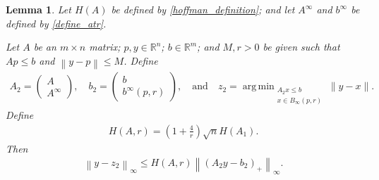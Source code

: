 \documentclass{article}
\newtheorem{lemma}[theorem]{Lemma}
\theoremstyle{case}
\numberwithin{theorem}{subsection}
\DeclareMathOperator*{\argmin}{arg\,min}
\newcommand{\atr}{A^{\infty}}
\newcommand{\btr}{b^{\infty}}
\newcommand{\bpr}{{B_{\infty}\left(p, r\right)}}
\newcommand{\Rm}{\mathbb R^m}
\newcommand{\Rn}{\mathbb R^n}
\begin{document}
\begin{lemma}
\label{version_of_hoffman_with_infinity_ball}
Let $H(A)$ be defined by \cref{hoffman_definition}; and let $\atr$ and $\btr$ be defined by \cref{define_atr}.

Let $A$ be an $m \times n$ matrix;
$p, y \in \Rn$; $b \in \Rm$;
and $M, r > 0$ be given 
such that $Ap \le b$ and $\left\|y - p\right\| \le M$.
Define 
\begin{align*}
A_2 = \begin{pmatrix} A \\ \atr \end{pmatrix},
\quad
b_2 = \begin{pmatrix} b \\ \btr\left(p, r\right) \end{pmatrix},
\quad \textrm{and} \quad
z_2 = \argmin_{\substack{A_2 x \le b \\ x \in \bpr} } \|y - x\|.
\end{align*}
Define 
\begin{align}
H\left(A, r\right) = \left(1 + \frac 4 r\right)\sqrt{n} H\left(A_1\right).
\label{define_har}
\end{align}
Then
\begin{align*}
\left\|y - z_2\right\|_{\infty} 
\le 
H\left(A, r\right)
\left\|\left(A_2y - b_2\right)_+\right\|_{\infty}.
\end{align*}
\end{lemma}
\end{document}
